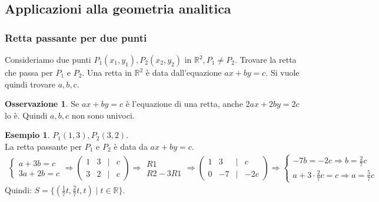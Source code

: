 \documentclass[a4paper]{article}
\theoremstyle{definition}
\newtheorem*{oss}{Osservazione}
\newtheorem*{es}{Esempio}
\begin{document}
	\subsection{Applicazioni alla geometria analitica}
	\subsubsection{Retta passante per due punti}
	Consideriamo due punti $P_1(x_1, y_1), P_2(x_2, y_2)$ in $\mathbb{R}^2, P_1 \ne P_2$. Trovare la retta che passa per $P_1$ e $P_2$.
	Una retta in $\mathbb{R}^2$ è data dall'equazione $ax + by = c$. Si vuole quindi trovare $a, b, c$.
	\begin{oss}
		Se $ax + by = c$ è l'equazione di una retta, anche $2ax + 2by = 2c$ lo è. Quindi $a, b, c$ non sono univoci.
	\end{oss}
	\begin{es}
		$P_1(1, 3), P_2(3, 2)$. \\
		La retta passante per $P_1$ e $P_2$ è data da $ax + by = c$.
		\begin{align*}
			\begin{cases}
				a + 3b = c \\
				3a + 2b = c
			\end{cases} \Rightarrow \begin{pmatrix}
				1 & 3 & \mid & c \\
				3 & 2 & \mid & c
			\end{pmatrix} \Rightarrow \begin{matrix}
				R1 \\
				R2 - 3R1
			\end{matrix} \Rightarrow \begin{pmatrix}
				1 & 3 & \mid & c \\
				0 & -7 & \mid & -2c
			\end{pmatrix} \Rightarrow \begin{cases}
				-7b = -2c \Rightarrow b = \frac{2}{7}c \\
				a + 3 \cdot \frac{2}{7}c = c \Rightarrow a = \frac{5}{7}c
			\end{cases}
		\end{align*}
		Quindi: $S = \{(\frac{1}{7}t, \frac{2}{7}t, t) \mid t \in \mathbb{R}\}$.
	\end{es}
\end{document}
